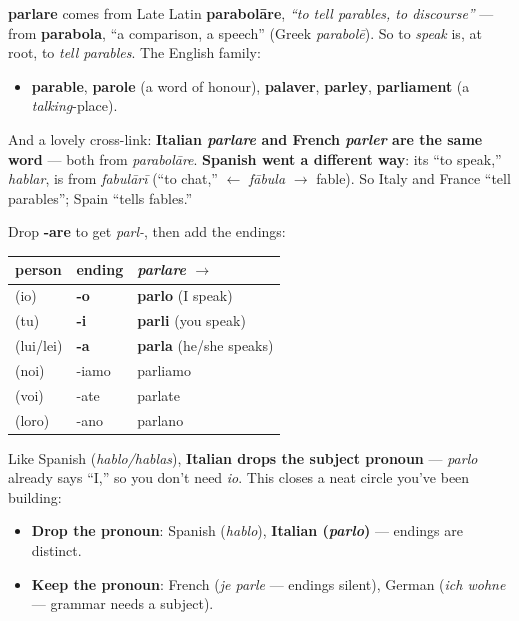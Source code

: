 \begin{cousinweb}
\textbf{parlare} comes from Late Latin \textbf{parabolāre}, \emph{\textquotedblleft{}to tell parables, to discourse\textquotedblright{}} — from \textbf{parabola}, \textquotedblleft{}a comparison, a speech\textquotedblright{} (Greek \emph{parabolē}). So to \emph{speak} is, at root, to \emph{tell parables}. The English family:

\begin{itemize}
\raggedright
  \item \textbf{parable}, \textbf{parole} (a word of honour), \textbf{palaver}, \textbf{parley}, \textbf{parliament} (a \emph{talking}-place).
\end{itemize}

And a lovely cross-link: \textbf{Italian \emph{parlare} and French \emph{parler} are the same word} — both from \emph{parabolāre}. \textbf{Spanish went a different way}: its \textquotedblleft{}to speak,\textquotedblright{} \emph{hablar}, is from \emph{fabulārī} (\textquotedblleft{}to chat,\textquotedblright{} $\leftarrow$ \emph{fābula} $\to$ fable). So Italy and France \textquotedblleft{}tell parables\textquotedblright{}; Spain \textquotedblleft{}tells fables.\textquotedblright{}
\end{cousinweb}

\begin{grammarlens}[title={Grammar Lens: the -are present tense (and pro-drop)}]
Drop \textbf{-are} to get \emph{parl-}, then add the endings:

\noindent
\begin{tabularx}{\linewidth}{@{}>{\raggedright\arraybackslash}X>{\raggedright\arraybackslash}X>{\raggedright\arraybackslash}X@{}}
\toprule
\textbf{person} & \textbf{ending} & \textbf{\emph{parlare} $\to$} \\
\midrule
(io) & \textbf{-o} & \textbf{parlo} (I speak) \\
(tu) & \textbf{-i} & \textbf{parli} (you speak) \\
(lui/lei) & \textbf{-a} & \textbf{parla} (he/she speaks) \\
(noi) & -iamo & parliamo \\
(voi) & -ate & parlate \\
(loro) & -ano & parlano \\
\bottomrule
\end{tabularx}

Like Spanish (\emph{hablo/hablas}), \textbf{Italian drops the subject pronoun} — \emph{parlo} already says \textquotedblleft{}I,\textquotedblright{} so you don't need \emph{io}. This closes a neat circle you've been building:

\begin{itemize}
\raggedright
  \item \textbf{Drop the pronoun}: Spanish (\emph{hablo}), \textbf{Italian (\emph{parlo})} — endings are distinct.
  \item \textbf{Keep the pronoun}: French (\emph{je parle} — endings silent), German (\emph{ich wohne} — grammar needs a subject).
\end{itemize}
\end{grammarlens}


